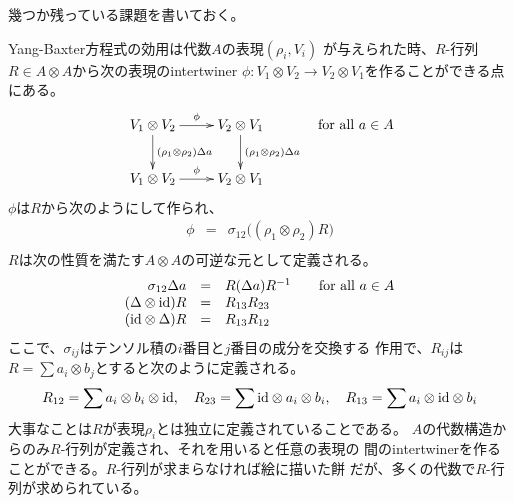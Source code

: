 {	幾つか残っている課題を書いておく。
	\begin{description}\setlength{\itemsep}{-1mm} %
		\item[Yang-Baxter] Yang-Baxter方程式の効用は代数$A$の表現$(\rho_i,V_i)$
		が与えられた時、$R$-行列$R\in A\otimes A$から次の表現のintertwiner
		$\phi:V_1\otimes V_2\to V_2\otimes V_1$を作ることができる点にある。
		\begin{equation*}\begin{split}
			\xymatrix{
				V_1\otimes V_2 \ar[r]^\phi \ar[d]^{(\rho_1\otimes\rho_2)\Delta a} 
				& V_2\otimes V_1 \ar[d]^{(\rho_1\otimes\rho_2)\Delta a} \\ 
				V_1\otimes V_2 \ar[r]^\phi & V_2\otimes V_1 \\ 
			} \quad\text{for all } a\in A
		\end{split}\end{equation*}
		$\phi$は$R$から次のようにして作られ、
		\begin{equation*}\begin{array}{rcll}
			\phi &=& \sigma_{12}\bigl((\rho_1\otimes\rho_2)R\bigr) \\
		\end{array}\end{equation*}
		$R$は次の性質を満たす$A\otimes A$の可逆な元として定義される。
		\begin{equation*}\begin{array}{rcll}
			\sigma_{12}\Delta a &=& R(\Delta a)R^{-1}
			&\quad\text{for all } a\in A \\
			(\Delta\otimes{\ensuremath{\operatorname{id}}})R &=& R_{13}R_{23} \\
			({\operatorname{id}}\otimes\Delta)R &=& R_{13}R_{12} \\
		\end{array}\end{equation*}
		ここで、$\sigma_{ij}$はテンソル積の$i$番目と$j$番目の成分を交換する
		作用で、$R_{ij}$は$R=\sum a_i\otimes b_j$とすると次のように定義される。
		\begin{equation*}\begin{split}
			R_{12} = \sum a_i\otimes b_i\otimes {\ensuremath{\operatorname{id}}}
			,\quad R_{23} = \sum {\ensuremath{\operatorname{id}}}\otimes a_i\otimes b_i
			,\quad R_{13} = \sum a_i\otimes {\ensuremath{\operatorname{id}}}\otimes b_i
		\end{split}\end{equation*}
		大事なことは$R$が表現$\rho_i$とは独立に定義されていることである。
		$A$の代数構造からのみ$R$-行列が定義され、それを用いると任意の表現の
		間のintertwinerを作ることができる。$R$-行列が求まらなければ絵に描いた餅
		だが、多くの代数で$R$-行列が求められている。

\end{description}}
